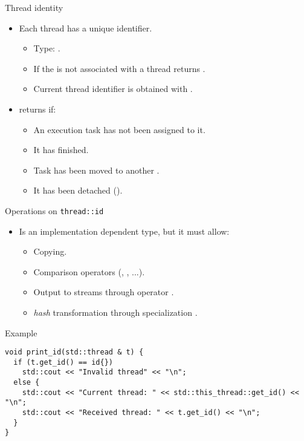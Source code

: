 \begin{frame}[t]{Thread identity}
\begin{itemize}
  \item Each thread has a unique identifier.
    \begin{itemize}
      \item Type: .
      \item If the  
            is not associated with a thread
             returns .
      \item Current thread identifier is obtained with
            .
    \end{itemize}

  \item {} returns  if:
    \begin{itemize}
      \item An execution task has not been assigned to it.
      \item It has finished.
      \item Task has been moved to another .
      \item It has been detached ().
    \end{itemize}
\end{itemize}
\end{frame}

\begin{frame}[fragile]{Operations on \texttt{thread::id}}
\begin{itemize}
  \item Is an implementation dependent type, but it must allow:
    \begin{itemize}
      \item Copying.
      \item Comparison operators (\cppid{==}, \cppid{<}, ...).
      \item Output to streams through operator \cppid{<<}.
      \item \emph{hash} transformation through specialization .
    \end{itemize}
\end{itemize}
\begin{block}{Example}
\begin{lstlisting}
void print_id(std::thread & t) {
  if (t.get_id() == id{}) 
    std::cout << "Invalid thread" << "\n";
  else {
    std::cout << "Current thread: " << std::this_thread::get_id() << "\n";
    std::cout << "Received thread: " << t.get_id() << "\n";
  }
}
\end{lstlisting}
\end{block}
\end{frame}

